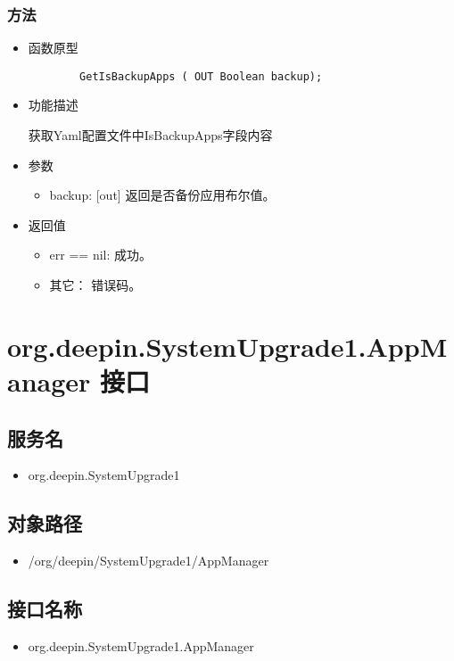 \documentclass{utart}
\begin{document}
\subsubsection{方法}
\begin{itemize}
    \item 函数原型
    
    \begin{verbatim}
        GetIsBackupApps ( OUT Boolean backup);
      \end{verbatim}
    \item 功能描述
    
    获取Yaml配置文件中IsBackupApps字段内容
    \item 参数
      \begin{itemize}
          \item backup: [out] 返回是否备份应用布尔值。
      \end{itemize}
    \item 返回值
      \begin{itemize}
          \item err == nil: 成功。
          \item 其它： 错误码。
      \end{itemize}
\end{itemize}


\section{org.deepin.SystemUpgrade1.AppManager 接口}
\subsection{服务名}
\begin{itemize}
    \item org.deepin.SystemUpgrade1
\end{itemize}

\subsection{对象路径}
\begin{itemize}
    \item /org/deepin/SystemUpgrade1/AppManager
\end{itemize}

\subsection{接口名称}
\begin{itemize}
    \item org.deepin.SystemUpgrade1.AppManager
\end{itemize}
\end{document}
